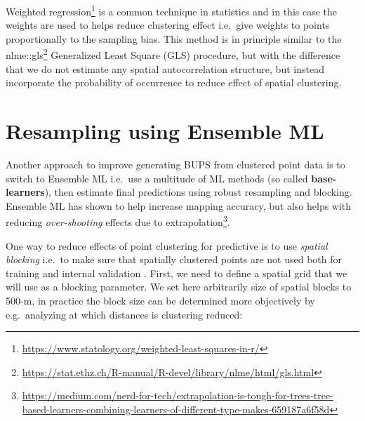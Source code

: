 \documentclass[
  graybox,natbib,nospthms]{svmono}
\renewcommand{\href}[2]{#2 (\url{#1})}
\renewcommand{\href}[2]{#2\footnote{\url{#1}}}
\begin{document}
\href{https://www.statology.org/weighted-least-squares-in-r/}{Weighted regression} is a common technique in statistics and in this case the weights are used to helps reduce
clustering effect i.e.~give weights to points proportionally to the sampling bias.
This method is in principle similar to the \href{https://stat.ethz.ch/R-manual/R-devel/library/nlme/html/gls.html}{nlme::gls} Generalized Least Square (GLS) procedure,
but with the difference that we do not estimate any spatial autocorrelation structure, but
instead incorporate the probability of occurrence to reduce effect of spatial clustering.

\hypertarget{resampling-using-ensemble-ml}{%
\section{Resampling using Ensemble ML}\label{resampling-using-ensemble-ml}}

Another approach to improve generating BUPS from clustered point data is to switch
to Ensemble ML i.e.~use a multitude of ML methods (so called \textbf{base-learners}),
then estimate final predictions using robust resampling and blocking. Ensemble ML
has shown to help increase mapping accuracy, but also helps with reducing \emph{over-shooting}
effects due to \href{https://medium.com/nerd-for-tech/extrapolation-is-tough-for-trees-tree-based-learners-combining-learners-of-different-type-makes-659187a6f58d}{extrapolation}.

One way to reduce effects of point clustering for predictive is to use \emph{spatial blocking}
i.e.~to make sure that spatially clustered points are not used both for training and
internal validation \citep{roberts2017cross}. First, we need to define a spatial grid that we will use
as a blocking parameter. We set here arbitrarily size of spatial blocks to 500-m,
in practice the block size can be determined more objectively by e.g.~analyzing
at which distances is clustering reduced:
\end{document}
